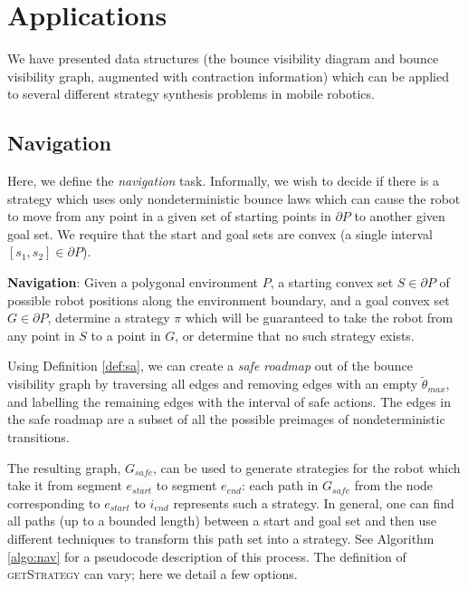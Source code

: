 \documentclass[]{styles/svproc}  %
\begin{document}
\section{Applications}

We have presented data structures (the bounce visibility diagram and bounce
visibility graph, augmented with contraction information) which can be applied
to several different strategy synthesis problems in mobile robotics.

\subsection{Navigation}

Here, we define the \emph{navigation} task. Informally, we wish to decide if
there is a strategy which uses only nondeterministic bounce laws which can cause
the robot to move from any point in a given set of starting points in $\partial P$ to
another given goal set. We require that the start and goal sets are
convex (a single interval $[s_1, s_2] \in \partial P$).

\begin{definition}
\textbf{Navigation}:
Given a polygonal environment $P$, a starting convex set $S \in \partial P$ of possible robot positions along the
environment boundary, and a goal convex set $G \in \partial P$, determine a strategy $\pi$ which
will be guaranteed to take the robot from any point in $S$ to a point in $G$, or
determine that no such strategy exists.
\end{definition}

Using Definition \ref{def:sa}, we can create a \emph{safe roadmap} out of the 
bounce visibility graph by traversing all edges and removing edges with an 
empty $\tilde{\theta}_{max}$, and labelling the remaining edges with the interval 
of safe actions. The edges in the safe roadmap are a subset of all the possible
preimages of nondeterministic transitions.

The resulting graph, $G_{safe}$, can be used to generate strategies for the
robot which take it from segment $e_{start}$ to segment $e_{end}$: each path in
$G_{safe}$ from the node corresponding to $e_{start}$ to $i_{end}$ represents
such a strategy. In general, one can find all paths (up to a bounded length)
between a start and goal set and then use different techniques to transform this
path set into a strategy. See Algorithm \ref{algo:nav} for a pseudocode
description of this process. The definition of \textsc{getStrategy} can vary;
here we detail a few options.
\end{document}
